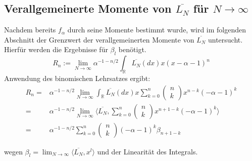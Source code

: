 \documentclass[a4paper, 11pt]{scrreprt}
\newcommand{\RR}{\mathbb{R}}
\newcommand{\student}[1]{\marginnote{{\normalfont\bf #1}}}
\begin{document}
\subsection*{Verallgemeinerte Momente von $ \overline{L_N} $ für $ N \to \infty $}
\student{Manuela}
Nachdem bereits $ f_\alpha $ durch seine Momente bestimmt wurde, wird im folgenden Abschnitt der Grenzwert der verallgemeinerten Momente von $ \overline{L_N} $ untersucht. Hierfür werden die Ergebnisse für $ \beta_l $ benötigt.\\
\begin{equation}
R_n:=\lim_{N \to \infty} \alpha^{-1-n/2} \int_{\RR}\overline{L_{N}}(dx)x(x-\alpha-1)^{n} 
\end{equation}
Anwendung des binomischen Lehrsatzes ergibt:
\begin{equation}
 \begin{split}
 R_n =& \alpha^{-1-n/2} \lim_{N \to \infty} \int_{\RR}\overline{L_{N}}(dx)x \sum_{k=0}^n \begin{pmatrix} n\\k\end{pmatrix} x^{n-k}(-\alpha -1)^k \\
 =& \alpha^{-1-n/2} \lim_{N \to \infty} \langle \overline{L_{N}}, \sum_{k=0}^n \begin{pmatrix} n\\k\end{pmatrix} x^{n+1-k}(-\alpha -1)^k \rangle \\
 =& \alpha^{-1-n/2}\sum_{k=0}^n \begin{pmatrix} n\\k\end{pmatrix} (-\alpha -1)^k \beta_{n+1-k}
 \end{split}
\end{equation}

wegen $\beta_l = \lim_{N\to\infty} \langle \overline{L_N}, x^l \rangle$ und der Linearität des Integrals.\\
\end{document}
